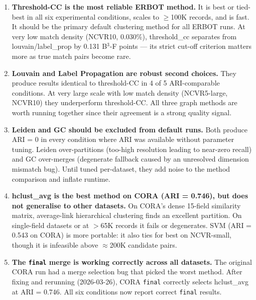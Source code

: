 \documentclass[11pt, a4paper]{article}
\begin{document}
\begin{enumerate}[leftmargin=*, label=\arabic*.]

  \item \textbf{Threshold-CC is the most reliable ERBOT method.}
        It is best or tied-best in all six experimental conditions, scales to
        $\geq$100K records, and is fast. It should be the primary default
        clustering method for all ERBOT runs. At very low match density
        (NCVR10, 0.030\%), threshold\_cc separates from louvain/label\_prop
        by 0.131 B$^3$-F points --- its strict cut-off criterion matters more
        as true match pairs become rare.

  \item \textbf{Louvain and Label Propagation are robust second choices.}
        They produce results identical to threshold-CC in 4 of 5 ARI-comparable conditions.
        At very large scale with low match density (NCVR5-large, NCVR10) they
        underperform threshold-CC. All three graph methods are worth running
        together since their agreement is a strong quality signal.

  \item \textbf{Leiden and GC should be excluded from default runs.}
        Both produce ARI = 0 in every condition where ARI was available without parameter
        tuning. Leiden over-partitions (too-high resolution leading to near-zero recall)
        and GC over-merges (degenerate fallback caused by an unresolved dimension mismatch
        bug). Until tuned per-dataset, they add noise to the method comparison and inflate
        runtime.

  \item \textbf{hclust\_avg is the best method on CORA (ARI = 0.746), but does not
        generalise to other datasets.}
        On CORA's dense 15-field similarity matrix, average-link hierarchical clustering
        finds an excellent partition. On single-field datasets or at $>$65K records it fails
        or degenerates. SVM (ARI = 0.543 on CORA) is more portable: it also ties for best
        on NCVR-small, though it is infeasible above $\approx$200K candidate pairs.

  \item \textbf{The \texttt{final} merge is working correctly across all datasets.}
        The original CORA run had a merge selection bug that picked the worst method.
        After fixing and rerunning (2026-03-26), CORA \texttt{final} correctly selects
        hclust\_avg at ARI = 0.746. All six conditions now report correct \texttt{final}
        results.


\end{enumerate}
\end{document}
